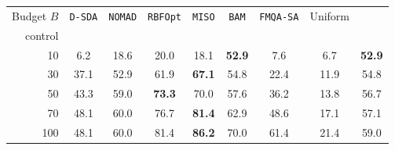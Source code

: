 \begin{tabular}{rcccccccc}\toprule
Budget \(B\) & \texttt{D-SDA} & \texttt{NOMAD} & \texttt{RBFOpt} & \texttt{MISO} & \texttt{BAM} & \texttt{FMQA-SA} & Uniform & \shortstack{\texttt{BAM}-prefix\\control}\\\midrule
10 & 6.2 & 18.6 & 20.0 & 18.1 & \textbf{52.9} & 7.6 & 6.7 & \textbf{52.9} \\
30 & 37.1 & 52.9 & 61.9 & \textbf{67.1} & 54.8 & 22.4 & 11.9 & 54.8 \\
50 & 43.3 & 59.0 & \textbf{73.3} & 70.0 & 57.6 & 36.2 & 13.8 & 56.7 \\
70 & 48.1 & 60.0 & 76.7 & \textbf{81.4} & 62.9 & 48.6 & 17.1 & 57.1 \\
100 & 48.1 & 60.0 & 81.4 & \textbf{86.2} & 70.0 & 61.4 & 21.4 & 59.0 \\
\bottomrule
\end{tabular}
